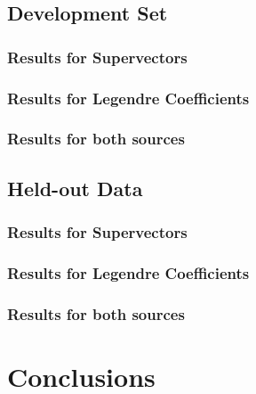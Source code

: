 \documentclass[11pt,a4paper]{tesis}
\begin{document}
	\section{Development Set}
		\subsection{Results for Supervectors}
			
		\subsection{Results for Legendre Coefficients}
			
		\subsection{Results for both sources}
			
	\section{Held-out Data}
		\subsection{Results for Supervectors}
		\subsection{Results for Legendre Coefficients}
		\subsection{Results for both sources}
\chapter{Conclusions}
 
\end{document}
